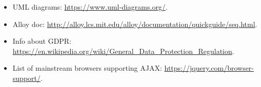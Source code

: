 \begin{itemize}
	\item UML diagrams: \url{https://www.uml‐diagrams.org/}.
    \item Alloy doc: \url{http://alloy.lcs.mit.edu/alloy/documentation/quickguide/seq.html}.
    \item Info about GDPR: \url{https://en.wikipedia.org/wiki/General_Data_Protection_Regulation}.
    \item List of mainstream browsers supporting AJAX: \url{https://jquery.com/browser-support/}.
\end{itemize}